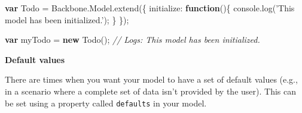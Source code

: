 \documentclass[9pt]{book}
\newenvironment{Shaded}{}{}
\newcommand{\KeywordTok}[1]{\textcolor[rgb]{0.00,0.44,0.13}{\textbf{{#1}}}}
\newcommand{\DataTypeTok}[1]{\textcolor[rgb]{0.56,0.13,0.00}{{#1}}}
\newcommand{\StringTok}[1]{\textcolor[rgb]{0.25,0.44,0.63}{{#1}}}
\newcommand{\CommentTok}[1]{\textcolor[rgb]{0.38,0.63,0.69}{\textit{{#1}}}}
\newcommand{\OtherTok}[1]{\textcolor[rgb]{0.00,0.44,0.13}{{#1}}}
\newcommand{\FunctionTok}[1]{\textcolor[rgb]{0.02,0.16,0.49}{{#1}}}
\newcommand{\NormalTok}[1]{{#1}}
\begin{document}
\begin{Shaded}
\begin{Highlighting}[]
\KeywordTok{var} \NormalTok{Todo = }\OtherTok{Backbone}\NormalTok{.}\OtherTok{Model}\NormalTok{.}\FunctionTok{extend}\NormalTok{(\{}
  \DataTypeTok{initialize}\NormalTok{: }\KeywordTok{function}\NormalTok{()\{}
      \OtherTok{console}\NormalTok{.}\FunctionTok{log}\NormalTok{(}\StringTok{'This model has been initialized.'}\NormalTok{);}
  \NormalTok{\}}
\NormalTok{\});}

\KeywordTok{var} \NormalTok{myTodo = }\KeywordTok{new} \FunctionTok{Todo}\NormalTok{();}
\CommentTok{// Logs: This model has been initialized.}
\end{Highlighting}
\end{Shaded}

\textbf{Default values}

There are times when you want your model to have a set of default values
(e.g., in a scenario where a complete set of data isn't provided by the
user). This can be set using a property called \texttt{defaults} in your
model.
\end{document}
